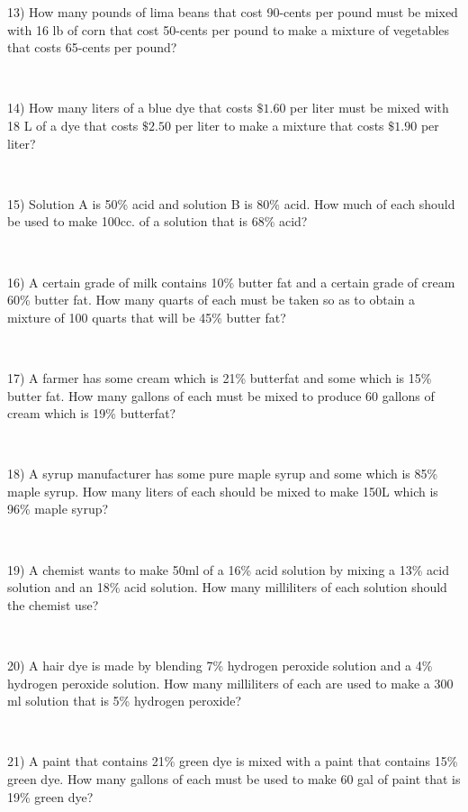 13) How many pounds of lima beans that cost 90-cents per pound must be
mixed with  16 lb of corn that cost 50-cents per pound to make
a mixture of vegetables that costs 65-cents per
pound?\par
~\par

14) How many liters of a blue dye that costs $\$1.60$ per liter must
be mixed with 18 L of a dye that costs $\$2.50$ per
liter to make a mixture that costs $\$1.90$ per liter?\par
~\par

15) Solution A is 50\% acid and solution B is 80\% acid. How much of each
should be used to make 100cc. of a solution that is 68\% acid?\par
~\par

16) A certain grade of milk contains 10\% butter fat and a certain grade of
cream 60\% butter fat. How many quarts of each must be taken so
as to obtain a mixture of 100 quarts that will be 45\%
butter fat?\par
~\par

17) A farmer has some cream which is 21\% butterfat and some which is 15\% butter fat. How many gallons of each must be mixed to
produce 60 gallons of cream which is 19\% butterfat?\par
~\par

18) A syrup manufacturer has some pure maple syrup and some which is 85\% maple syrup. How many liters of each should be mixed to make
150L which  is 96\% maple syrup?\par
~\par

19) A chemist wants to make 50ml of a 16\% acid solution by mixing a 13\% acid solution and an 18\% acid solution. How many milliliters of
each solution should the chemist use?\par
~\par

20) A hair dye is made by blending 7\% hydrogen peroxide solution and a 4\% hydrogen peroxide solution. How many milliliters of each
are used to make a 300 ml solution that is 5\% hydrogen
peroxide?\par
~\par

21) A paint that contains 21\% green dye is mixed with a paint that contains
15\%  green dye. How many gallons of each must be used to make 60
gal of paint that is 19\% green dye?\par
~\par


